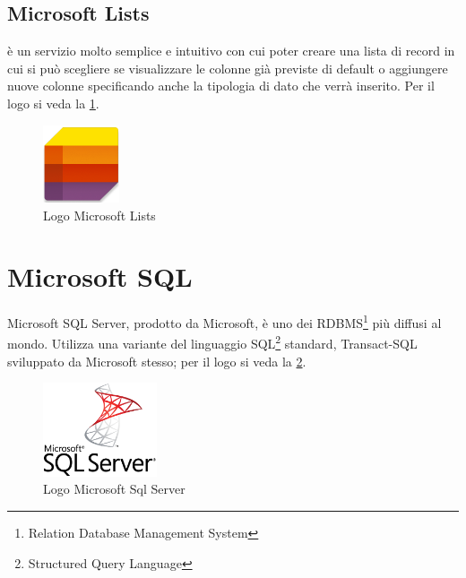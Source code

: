 \subsection{Microsoft Lists} \label{tec:Microsoft Lists}
è un servizio molto semplice e intuitivo con cui poter creare una lista di record in cui si può scegliere se visualizzare le colonne già previste di default o aggiungere nuove colonne specificando anche la tipologia di dato che verrà inserito. Per il logo si veda la \figurename \space \ref*{fig:M-Lists}.
\begin{figure}[H]
    \centering\includegraphics[width=0.2\textwidth, height=0.2\textheight,keepaspectratio]{immagini/logo-MicrosoftLists2.png}
    \caption{Logo Microsoft Lists}
    \label{fig:M-Lists}
\end{figure}

\section{Microsoft SQL} \label{tec:Microsoft SQL}
Microsoft SQL Server, prodotto da Microsoft, è uno dei RDBMS\footnote{Relation Database Management System} più diffusi al mondo. 
Utilizza una variante del linguaggio SQL\footnote{Structured Query Language} standard, Transact-SQL sviluppato da Microsoft stesso; per il logo si veda la \figurename \space \ref*{fig:M-SQL}.
\begin{figure}[H]
    \centering\includegraphics[width=0.3\textwidth, height=0.3\textheight,keepaspectratio]{immagini/logo-SqlServer.png}
    \caption{Logo Microsoft Sql Server}
    \label{fig:M-SQL}
\end{figure}

